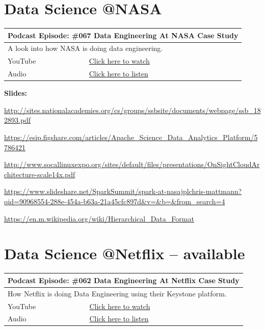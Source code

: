 \documentclass[12pt, numbers=noenddot]{scrreprt} %
\begin{document}
\section{Data Science @NASA}

\begin{table}[h]
\begin{tabular}{ll}
\hline
\multicolumn{2}{l}{\textbf{Podcast Episode:} \#067 Data Engineering At NASA Case Study} \\ \hline
\multicolumn{2}{p{15cm}}{A look into how NASA is doing data engineering.}         \\ \hline
\multicolumn{1}{l|}{YouTube}   & \href{https://youtu.be/Pctn_1UoNjA}{Click here to watch}   \\ 
\multicolumn{1}{l|}{Audio}     & \href{https://anchor.fm/andreaskayy/episodes/067-Data-Engineering-At-NASA-Case-Study-e45ina}{Click here to listen}   \\ \hline
\end{tabular}
\end{table}

\textbf{Slides:}

\url{http://sites.nationalacademies.org/cs/groups/ssbsite/documents/webpage/ssb_182893.pdf}

\url{https://esip.figshare.com/articles/Apache_Science_Data_Analytics_Platform/5786421}

\url{http://www.socallinuxexpo.org/sites/default/files/presentations/OnSightCloudArchitecture-scale14x.pdf}

\url{https://www.slideshare.net/SparkSummit/spark-at-nasajplchris-mattmann?qid=90968554-288e-454a-b63a-21a45cfc897d&v=&b=&from_search=4}

\url{https://en.m.wikipedia.org/wiki/Hierarchical_Data_Format}

\section{Data Science @Netflix -- available}

\begin{table}[h]
\begin{tabular}{ll}
\hline
\multicolumn{2}{l}{\textbf{Podcast Episode:} \#062 Data Engineering At Netflix Case Study} \\ \hline
\multicolumn{2}{p{15cm}}{How Netflix is doing Data Engineering using their Keystone platform.}         \\ \hline
\multicolumn{1}{l|}{YouTube}   & \href{https://youtu.be/YWPsYpjNKeM}{Click here to watch}   \\ 
\multicolumn{1}{l|}{Audio}     & \href{https://anchor.fm/andreaskayy/episodes/062-Data-Engineering-At-Netflix-Case-Study-e45ikp}{Click here to listen}   \\ \hline
\end{tabular}
\end{table}
\end{document}
